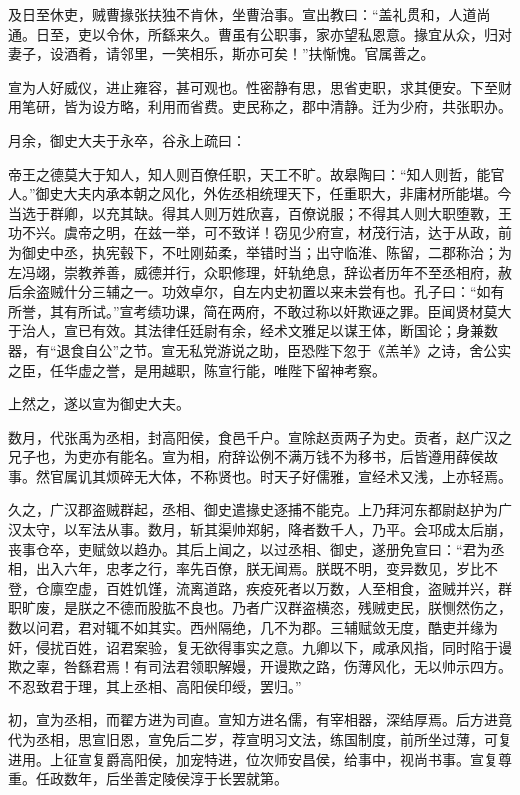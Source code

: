 \documentclass[]{article}
\begin{document}
及日至休吏，贼曹掾张扶独不肯休，坐曹治事。宣出教曰：``盖礼贯和，人道尚通。日至，吏以令休，所繇来久。曹虽有公职事，家亦望私恩意。掾宜从众，归对妻子，设酒肴，请邻里，一笑相乐，斯亦可矣！''扶惭愧。官属善之。

宣为人好威仪，进止雍容，甚可观也。性密静有思，思省吏职，求其便安。下至财用笔研，皆为设方略，利用而省费。吏民称之，郡中清静。迁为少府，共张职办。

月余，御史大夫于永卒，谷永上疏曰：

帝王之德莫大于知人，知人则百僚任职，天工不旷。故皋陶曰：``知人则哲，能官人。''御史大夫内承本朝之风化，外佐丞相统理天下，任重职大，非庸材所能堪。今当选于群卿，以充其缺。得其人则万姓欣喜，百僚说服；不得其人则大职堕斁，王功不兴。虞帝之明，在兹一举，可不致详！窃见少府宣，材茂行洁，达于从政，前为御史中丞，执宪毂下，不吐刚茹柔，举错时当；出守临淮、陈留，二郡称治；为左冯翊，崇教养善，威德并行，众职修理，奸轨绝息，辞讼者历年不至丞相府，赦后余盗贼什分三辅之一。功效卓尔，自左内史初置以来未尝有也。孔子曰：``如有所誉，其有所试。''宣考绩功课，简在两府，不敢过称以奸欺诬之罪。臣闻贤材莫大于治人，宣已有效。其法律任廷尉有余，经术文雅足以谋王体，断国论；身兼数器，有``退食自公''之节。宣无私党游说之助，臣恐陛下忽于《羔羊》之诗，舍公实之臣，任华虚之誉，是用越职，陈宣行能，唯陛下留神考察。

上然之，遂以宣为御史大夫。

数月，代张禹为丞相，封高阳侯，食邑千户。宣除赵贡两子为史。贡者，赵广汉之兄子也，为吏亦有能名。宣为相，府辞讼例不满万钱不为移书，后皆遵用薛侯故事。然官属讥其烦碎无大体，不称贤也。时天子好儒雅，宣经术又浅，上亦轻焉。

久之，广汉郡盗贼群起，丞相、御史遣掾史逐捕不能克。上乃拜河东都尉赵护为广汉太守，以军法从事。数月，斩其渠帅郑躬，降者数千人，乃平。会邛成太后崩，丧事仓卒，吏赋敛以趋办。其后上闻之，以过丞相、御史，遂册免宣曰：``君为丞相，出入六年，忠孝之行，率先百僚，朕无闻焉。朕既不明，变异数见，岁比不登，仓廪空虚，百姓饥馑，流离道路，疾疫死者以万数，人至相食，盗贼并兴，群职旷废，是朕之不德而股肱不良也。乃者广汉群盗横恣，残贼吏民，朕恻然伤之，数以问君，君对辄不如其实。西州隔绝，几不为郡。三辅赋敛无度，酷吏并缘为奸，侵扰百姓，诏君案验，复无欲得事实之意。九卿以下，咸承风指，同时陷于谩欺之辜，咎繇君焉！有司法君领职解嫚，开谩欺之路，伤薄风化，无以帅示四方。不忍致君于理，其上丞相、高阳侯印绶，罢归。''

初，宣为丞相，而翟方进为司直。宣知方进名儒，有宰相器，深结厚焉。后方进竟代为丞相，思宣旧恩，宣免后二岁，荐宣明习文法，练国制度，前所坐过薄，可复进用。上征宣复爵高阳侯，加宠特进，位次师安昌侯，给事中，视尚书事。宣复尊重。任政数年，后坐善定陵侯淳于长罢就第。
\end{document}
